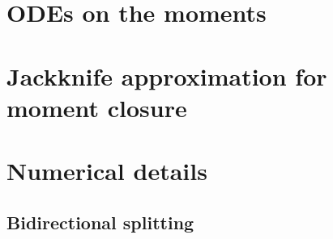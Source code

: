 \appendix
\section{ODEs on the moments} \label{calc}

\section{Jackknife approximation for moment closure}

\section{Numerical details}
\subsection{Bidirectional splitting}

 
